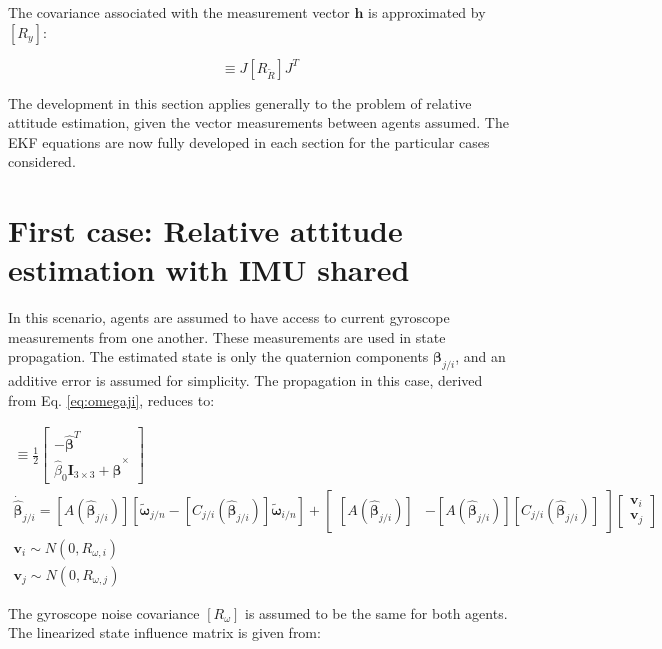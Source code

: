\documentclass{aiaa-tc}
\newcommand{\B}[1]{\textbf{#1}} %
\newcommand{\BG}[1]{{\bm #1}}           %
\begin{document}
The covariance associated with the measurement vector $\B{h}$ is approximated by $[R_y]$:

\begin{equation}
[R_y] \equiv J[R_{\tilde{R}}]J^T
\end{equation}

The development in this section applies generally to the problem of relative attitude estimation, given the vector measurements between agents assumed. The EKF equations are now fully developed in each section for the particular cases considered.

\section{ First case: Relative attitude estimation with IMU shared }

In this scenario, agents are assumed to have access to current gyroscope measurements from one another. These measurements are used in state propagation. The estimated state is only the quaternion components $\BG{\beta}_{j/i}$, and an additive error is assumed for simplicity. The propagation in this case, derived from Eq. \ref{eq:omegaji}, reduces to:

\begin{align}
[A(\hat{\BG{\beta}}_{j/i})] \equiv \frac{1}{2} \begin{bmatrix}
-\hat{\BG{\beta}}^T \\
\hat{\beta}_0 \B{I}_{3\times 3} + \hat{\BG{\beta}}^\times
\end{bmatrix} \\
\dot{\hat{\BG{\beta}}}_{j/i} = [A(\hat{\BG{\beta}}_{j/i})] [\tilde{\BG{\omega}}_{j/n} - [C_{j/i}(\hat{\BG{\beta}}_{j/i})] \tilde{\BG{\omega}}_{i/n}] + 
\begin{bmatrix}
[A(\hat{\BG{\beta}}_{j/i})] & -[A(\hat{\BG{\beta}}_{j/i})][C_{j/i}(\hat{\BG{\beta}}_{j/i})]
\end{bmatrix} 
\begin{bmatrix}
\B{v}_i \\
\B{v}_j
\end{bmatrix} \\
\B{v}_i \sim N(0,R_{\omega,i}) \\
\B{v}_j \sim N(0,R_{\omega,j})
\end{align}

The gyroscope noise covariance $[R_{\omega}]$ is assumed to be the same for both agents. The linearized state influence matrix is given from:
\end{document}
